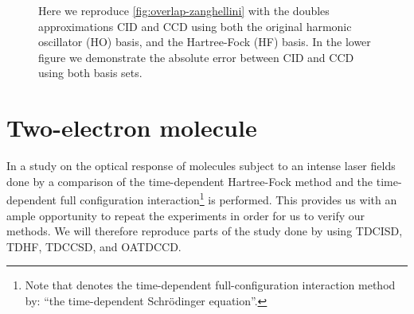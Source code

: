 \begin{figure}
            \caption{Here we reproduce \autoref{fig:overlap-zanghellini} with
            the doubles approximations CID and CCD using both the original
            harmonic oscillator (HO) basis, and the Hartree-Fock (HF) basis.
            In the lower figure we demonstrate the absolute error between CID
            and CCD using both basis sets.}
            \label{fig:overlap-doubles-zanghellini}
        \end{figure}



    \section{Two-electron molecule}
        In a study on the optical response of molecules subject to an
        intense laser fields done by \citeauthor{li_2005} \cite{li_2005} a
        comparison of the time-dependent Hartree-Fock method and the
        time-dependent full configuration interaction\footnote{%
            Note that \citeauthor{li_2005} denotes the time-dependent
            full-configuration interaction method by: ``the time-dependent
            Schrödinger equation''.
        } is performed.
        This provides us with an ample opportunity to repeat the
        experiments in order for us to verify our methods.
        We will therefore reproduce parts of the study done by
        \citeauthor{li_2005} using TDCISD, TDHF, TDCCSD, and OATDCCD.

